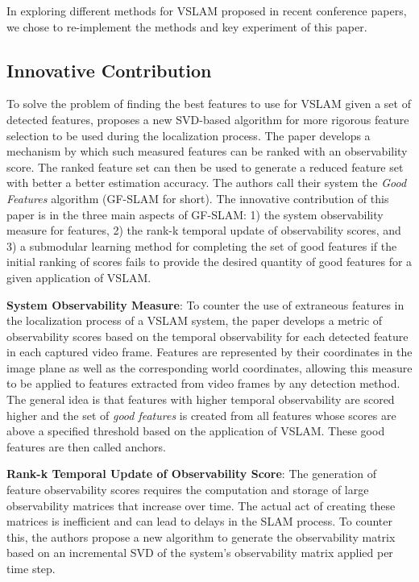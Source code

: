 \documentclass[10pt,twocolumn,letterpaper]{article}
\begin{document}
In exploring different methods for VSLAM proposed in recent conference papers, 
we chose to re-implement the methods and key experiment of this paper.

\subsection{Innovative Contribution}
To solve the problem of finding the best features to use for VSLAM given a set of detected features, 
\cite{Zhang_2015_CVPR} proposes a new SVD-based algorithm for more rigorous feature selection to be used 
during the localization process. The paper develops a mechanism by which such measured features 
can be ranked with an observability score. The ranked feature set can then be used to generate a 
reduced feature set with better a better estimation accuracy. The authors call their system the \textit{Good 
Features} algorithm (GF-SLAM for short). The innovative contribution of this paper is in the three main 
aspects of GF-SLAM: 1) the system observability measure for features, 2) the rank-k temporal update 
of observability scores, and 3) a submodular learning method for completing the set of good features if 
the initial ranking of scores fails to provide the desired quantity of good features for a given application of 
VSLAM.

\textbf{System Observability Measure}: To counter the use of extraneous features in the localization process 
of a VSLAM system, the paper develops a metric of observability scores based on the temporal observability 
for each detected feature in each captured video frame. Features are represented by their coordinates in the 
image plane as well as the corresponding world coordinates, allowing this measure to be applied to features 
extracted from video frames by any detection method. The general idea is that features with higher temporal 
observability are scored higher and the set of \textit{good features} is created from all features whose scores are 
above a specified threshold based on the application of VSLAM. These good features are then called 
anchors.

\textbf{Rank-k Temporal Update of Observability Score}: The generation of feature observability 
scores requires 
the computation and storage of large observability matrices that increase over time. 
The actual act of creating these matrices is inefficient and can lead to delays 
in the SLAM process. To counter this, the authors propose a new algorithm to generate the 
observability matrix 
based on an incremental SVD of the system's observability matrix applied per time step.
\end{document}
